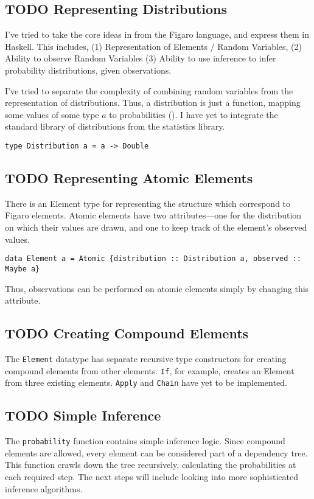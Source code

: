\documentclass[11pt]{article}
\begin{document}
\subsection{{\bfseries\sffamily TODO} Representing Distributions}
\label{sec-1-4}
I've tried to take the core ideas in from the Figaro language, and express
them in Haskell. This includes, (1) Representation of Elements / Random Variables,
(2) Ability to observe Random Variables (3) Ability to use inference to infer
probability distributions, given observations.

I've tried to separate the complexity of combining random variables from
the representation of distributions. Thus, a distribution is just a function,
mapping some values of some type $a$ to probabilities (). I have yet
to integrate the standard library of distributions from the statistics library.
\begin{center}
\texttt{type Distribution a = a -> Double}
\end{center}

\subsection{{\bfseries\sffamily TODO} Representing Atomic Elements}
\label{sec-1-5}
There is an Element type for representing the structure which correspond
to Figaro elements. Atomic elements have two attributes---one for the distribution
on which their values are drawn, and one to keep track of the element's observed
values.

\begin{center}
\texttt{data Element a = Atomic \{distribution :: Distribution a, observed :: Maybe a\}}
\end{center}

Thus, observations can be performed on atomic elements simply by
changing this attribute.

\subsection{{\bfseries\sffamily TODO} Creating Compound Elements}
\label{sec-1-6}
The \texttt{Element} datatype has separate recursive type constructors for creating
compound elements from other elements. \texttt{If}, for example, creates an Element
from three existing elements. \texttt{Apply} and \texttt{Chain} have yet to be implemented.

\subsection{{\bfseries\sffamily TODO} Simple Inference}
\label{sec-1-7}
The \texttt{probability} function contains simple inference logic. Since
compound elements are allowed, every element can be considered part of
a dependency tree. This function crawls down the tree recursively, calculating
the probabilities at each required step. The next steps will include looking
into more sophisticated inference algorithms.
\end{document}
